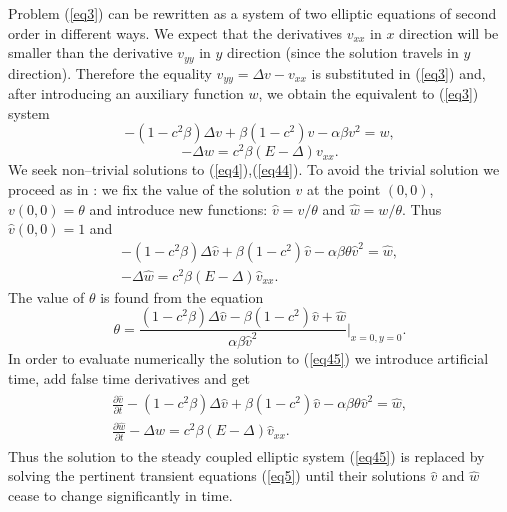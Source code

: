 \documentclass[leqno,11pt]{book}
\newcommand{\rf}[1]{(\ref{#1})}
\begin{document}
Problem \rf{eq3} can be rewritten  as a  system of two elliptic equations of second order in different ways. We expect that  the derivatives $v_{xx}$ in $x $ direction  will be smaller than the derivative $v_{yy}$ in $y$ direction (since the solution travels in $y$ direction). Therefore the equality $v_{yy} = \Delta v- v_{xx}$ is substituted in \rf{eq3} and, after  introducing an auxiliary  function $w$, we obtain the equivalent to \rf{eq3} system
\begin{equation}\label{eq4}
- (1- c^2 \beta) \Delta v + \beta (1-c^2) v - \alpha \beta v^2 = w, 
\end{equation}
\begin{equation}\label{eq44}
 - \Delta w = c^2 \beta (E- \Delta) v_{xx}. 
\end{equation}
We  seek  non--trivial solutions to \rf{eq4},\rf{eq44}. To avoid the trivial solution we proceed as in \cite{Ch2012,chd-chr}: we fix the value of the solution $v$ at the point $(0,0)$,    $v(0,0)=\theta $ and introduce  new  functions: $\widehat{v}=v/{\theta} $ and $\widehat{w}=w/{\theta} $. Thus  
$ \widehat{v}(0,0)=1$ and 
\begin{equation}\label{eq45}
\begin{split}
 - (1 - c^2 \beta) \Delta \widehat{v} + \beta (1-c^2) \widehat{v} - \alpha \beta \theta \widehat{v}^2 = \widehat{w}, \\
 - \Delta \widehat{w} =  c^2 \beta (E- \Delta) \widehat{v}_{xx}.\;\;\;\; \;\;\;\;  \;\;\;\;  \;\;\;\; 
\end{split}
\end{equation}
The value of $\theta $ is found from the  equation 
\begin{equation}\label{eqtheta}
\theta = \frac{ (1-c^2 \beta) \Delta \widehat{v} - \beta (1-c^2) \widehat{v} +\widehat{w}}{\alpha \beta \widehat{v}^2 } |_{x=0,y=0} .
\end{equation}
In order to evaluate numerically the solution to \rf{eq45} we introduce artificial time, add false  time derivatives and  get
\begin{align}\label{eq5}
\begin{split}
 \frac {\partial \widehat{v}}{\partial t} - (1-c^2 \beta) \Delta \widehat{v} + \beta (1-c^2) \widehat{v} - \alpha \beta \theta \widehat{v}^2 = \widehat{w}, \\
 \frac {\partial \widehat{w}}{\partial t} - \Delta \widehat{w} =  c^2 \beta (E- \Delta) \widehat{v}_{xx}. \;\;\;\;  \;\;\;\;  \;\;\;\;  \;\;\;\;
\end{split}
\end{align}
Thus the solution to the steady coupled elliptic system \rf{eq45} is replaced by   solving the  pertinent transient equations \rf{eq5} until their solutions $\widehat{v}$ and $\widehat{w}$ cease to change significantly in time. 
\end{document}
